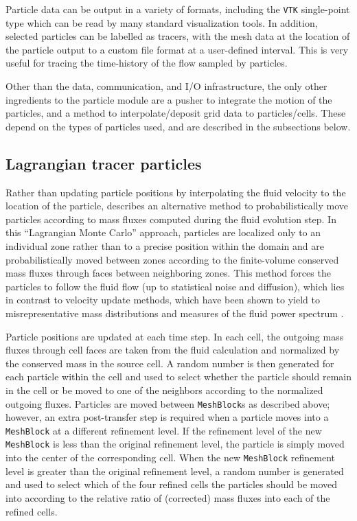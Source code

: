 \documentclass[twocolumn, floatfix]{aastex63}
\begin{document}
Particle data can be output in a variety of formats, including the \texttt{VTK} single-point type which can be read by many standard visualization tools.  In addition, selected particles can be labelled as tracers, with the mesh data at the location of the particle output to a custom file format at a user-defined interval.  This is very useful for tracing the time-history of the flow sampled by particles.

Other than the data, communication, and I/O infrastructure, the only other ingredients to the particle module are a pusher to integrate the motion of the particles, and a method to interpolate/deposit grid data to particles/cells.  These depend on the types of particles used, and are described in the subsections below.

\subsection{Lagrangian tracer particles}

Rather than updating particle positions by interpolating the fluid velocity to the location of the particle, \citet{2013MNRAS.435.1426G} describes an alternative method to probabilistically move particles according to mass fluxes computed during the fluid evolution step. In this ``Lagrangian Monte Carlo'' approach, particles are localized only to an individual zone rather than to a precise position within the domain and are probabilistically moved between zones according to the finite-volume conserved mass fluxes through faces between neighboring zones. This method forces the particles to follow the fluid flow (up to statistical noise and diffusion), which lies in contrast to velocity update methods, which have been shown to yield to misrepresentative mass distributions and measures of the fluid power spectrum \citep{2013MNRAS.435.1426G}.

Particle positions are updated at each time step. In each cell, the outgoing mass fluxes through cell faces are taken from the fluid calculation and normalized by the conserved mass in the source cell. A random number is then generated for each particle within the cell and used to select whether the particle should remain in the cell or be moved to one of the neighbors according to the normalized outgoing fluxes. Particles are moved between \texttt{MeshBlock}s as described above; however, an extra post-transfer step is required when a particle moves into a \texttt{MeshBlock} at a different refinement level. If the refinement level of the new \texttt{MeshBlock} is less than the original refinement level, the particle is simply moved into the center of the corresponding cell. When the new \texttt{MeshBlock} refinement level is greater than the original refinement level, a random number is generated and used to select which of the four refined cells the particles should be moved into according to the relative ratio of (corrected) mass fluxes into each of the refined cells.
\end{document}
